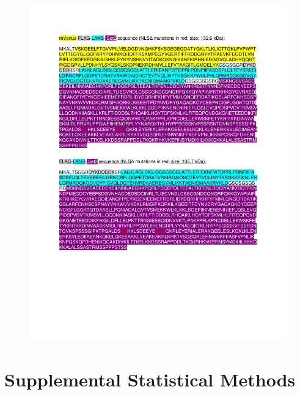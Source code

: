 \documentclass[11pt]{biorxiv}
\begin{document}
\begin{figure}[ht!]
\center
\includegraphics[width=\textwidth, trim={0in 2in 0in 1in}, clip]{notes/Supplemental_Note.pdf}
\end{figure}

\section{Supplemental Statistical Methods}
\end{document}
